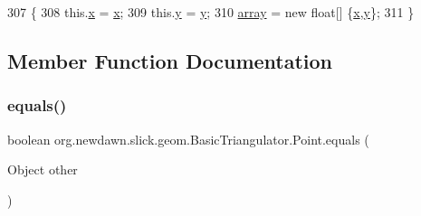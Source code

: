 \begin{DoxyCode}
307                                        \{
308             this.\mbox{\hyperlink{classorg_1_1newdawn_1_1slick_1_1geom_1_1_basic_triangulator_1_1_point_a430d2074970ce9d8248e998f45e0deac}{x}} = \mbox{\hyperlink{classorg_1_1newdawn_1_1slick_1_1geom_1_1_basic_triangulator_1_1_point_a430d2074970ce9d8248e998f45e0deac}{x}};
309             this.\mbox{\hyperlink{classorg_1_1newdawn_1_1slick_1_1geom_1_1_basic_triangulator_1_1_point_aad601993c7f613bd1e26c48a62a950d7}{y}} = \mbox{\hyperlink{classorg_1_1newdawn_1_1slick_1_1geom_1_1_basic_triangulator_1_1_point_aad601993c7f613bd1e26c48a62a950d7}{y}};
310             \mbox{\hyperlink{classorg_1_1newdawn_1_1slick_1_1geom_1_1_basic_triangulator_1_1_point_a029a72bfc3c624500744d9650e06aa77}{array}} = \textcolor{keyword}{new} \textcolor{keywordtype}{float}[] \{\mbox{\hyperlink{classorg_1_1newdawn_1_1slick_1_1geom_1_1_basic_triangulator_1_1_point_a430d2074970ce9d8248e998f45e0deac}{x}},\mbox{\hyperlink{classorg_1_1newdawn_1_1slick_1_1geom_1_1_basic_triangulator_1_1_point_aad601993c7f613bd1e26c48a62a950d7}{y}}\};
311         \}
\end{DoxyCode}


\subsection{Member Function Documentation}
\mbox{\label{classorg_1_1newdawn_1_1slick_1_1geom_1_1_basic_triangulator_1_1_point_ac04a7b88ef5fa9160ca9f146e9585791}} 
\subsubsection{\texorpdfstring{equals()}{equals()}}
{\footnotesize\ttfamily boolean org.\+newdawn.\+slick.\+geom.\+Basic\+Triangulator.\+Point.\+equals (\begin{DoxyParamCaption}\item[{Object}]{other }\end{DoxyParamCaption})\hspace{0.3cm}{\ttfamily [inline]}}

